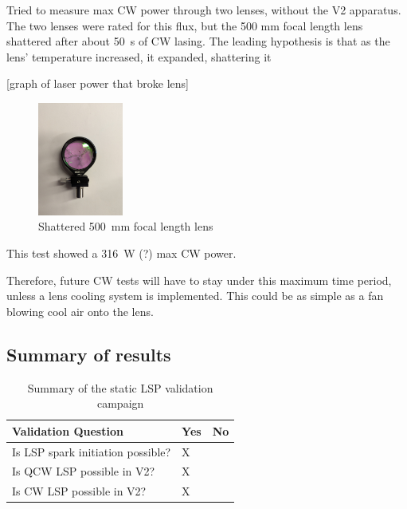             Tried to measure max CW power through two lenses, without the V2 apparatus. The two lenses were rated for this flux, but the 500 mm focal length lens shattered after about \qty{50}{s} of CW lasing. The leading hypothesis is that as the lens' temperature increased, it expanded, shattering it
    
            [graph of laser power that broke lens]
    
            \begin{figure}[!ht]
                \centering
                \includegraphics[width=0.25\textwidth]{assets/4 experiments/Shattered 500 mm lens.jpg}
                \caption{Shattered \qty{500}{mm} focal length lens}
            \end{figure}
    
            This test showed a \qty{316}{W} (?) max CW power.
    
            Therefore, future CW tests will have to stay under this maximum time period, unless a lens cooling system is implemented. This could be as simple as a fan blowing cool air onto the lens.

        \subsection{Summary of results}

            \begin{table}[!ht]
                \centering
                \caption{Summary of the static LSP validation campaign}
                \label{tab:validation}
                \begin{tabular}{@{}lll@{}}
                \toprule
                Validation Question               & Yes & No \\ \midrule
                Is LSP spark initiation possible? & X   &    \\
                Is QCW LSP possible in V2?        & X   &    \\
                Is CW LSP possible in V2?         & X   &   
                \end{tabular}
            \end{table}


